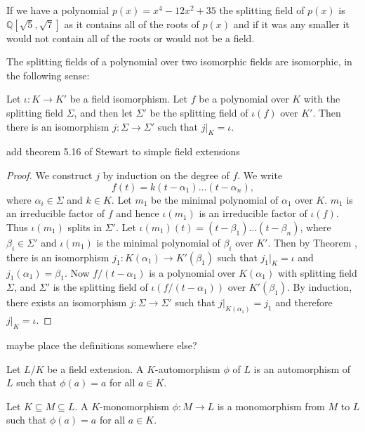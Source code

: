 \begin{example}
If we have a polynomial \(p(x) = x^4 - 12x^2 + 35\) the splitting field of \(p(x)\) is \(\mathbb{Q}[\sqrt{5},\sqrt{7}]\) as it contains all of the roots of \(p(x)\) and if it was any smaller it would not contain all of the roots or would not be a field.
\end{example}

The splitting fields of a polynomial over two isomorphic fields are isomorphic, in the following sense:

\begin{theorem} \label{thm:splitting-field-unique}
	Let $\iota: K \to K'$ be a field isomorphism. Let $f$ be a polynomial over $K$ with the splitting field $\Sigma$, and then let $\Sigma'$ be the splitting field of $\iota(f)$ over $K'$. Then there is an isomorphism $j : \Sigma \to \Sigma'$ such that $j | _K = \iota$. 
\end{theorem}
\TODO add theorem 5.16 of Stewart to simple field extensions

\begin{proof}
	We construct $j$ by induction on the degree of $f$. We write $$ f(t) = k (t - \alpha_1) \ldots (t - \alpha_n), $$ where $\alpha_i \in \Sigma$ and $k \in K$. Let $m_1$ be the minimal polynomial of $\alpha_1$ over $K$. $m_1$ is an irreducible factor of $f$ and hence $\iota(m_1)$ is an irreducible factor of $\iota(f)$. Thus $\iota(m_1)$ splits in $\Sigma'$. Let $\iota(m_1)(t) = (t - \beta_1) \ldots (t - \beta_n)$, where $\beta_i \in \Sigma'$ and $\iota(m_1)$ is the minimal polynomial of $\beta_i$ over $K'$. Then by Theorem \TODO, there is an isomorphism $j_1 : K(\alpha_1) \to K'(\beta_1)$ such that $j_1 | _K = \iota$ and $j_1(\alpha_1) = \beta_1$. Now $f / (t - \alpha_1)$ is a polynomial over $K(\alpha_1)$ with splitting field $\Sigma$, and $\Sigma'$ is the splitting field of $\iota(f / (t - \alpha_1))$ over $K'(\beta_1)$. By induction, there exists an isomorphism $j: \Sigma \to \Sigma'$ such that $j | _{K(\alpha_1)} = j_1$ and therefore $j | _K = \iota$. 
\end{proof}

\TODO maybe place the definitions somewhere else?
\begin{definition} \label{def:automorphism}
	Let $L/K$ be a field extension. A $K$-automorphism $\phi$ of $L$ is an automorphism of $L$ such that $\phi(a) = a$ for all $a \in K$. 
\end{definition}

\begin{definition}
	Let $K \subseteq M \subseteq L$. A $K$-monomorphism $\phi : M \to L$ is a monomorphism from $M$ to $L$ such that $\phi(a) = a$ for all $a \in K$. 
\end{definition}

